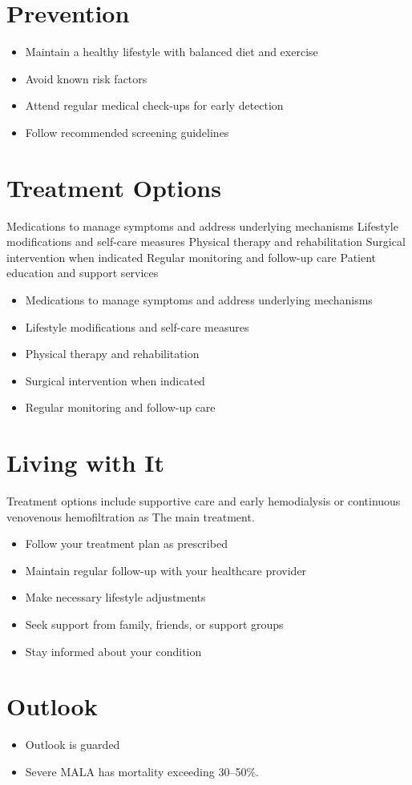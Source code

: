 \section{Prevention}
\begin{itemize}[noitemsep]
  \item Maintain a healthy lifestyle with balanced diet and exercise
  \item Avoid known risk factors
  \item Attend regular medical check-ups for early detection
  \item Follow recommended screening guidelines
\end{itemize}
\section{Treatment Options}
Medications to manage symptoms and address underlying mechanisms Lifestyle modifications and self-care measures Physical therapy and rehabilitation Surgical intervention when indicated Regular monitoring and follow-up care Patient education and support services

\begin{itemize}[noitemsep]
  \item Medications to manage symptoms and address underlying mechanisms
  \item Lifestyle modifications and self-care measures
  \item Physical therapy and rehabilitation
  \item Surgical intervention when indicated
  \item Regular monitoring and follow-up care
\end{itemize}
\section{Living with It}
Treatment options include supportive care and early hemodialysis or continuous venovenous hemofiltration as The main treatment.

\begin{itemize}[noitemsep]
  \item Follow your treatment plan as prescribed
  \item Maintain regular follow-up with your healthcare provider
  \item Make necessary lifestyle adjustments
  \item Seek support from family, friends, or support groups
  \item Stay informed about your condition
\end{itemize}
\section{Outlook}
\begin{itemize}[noitemsep]
  \item Outlook is guarded
  \item Severe MALA has mortality exceeding 30--50\%.
\end{itemize}
